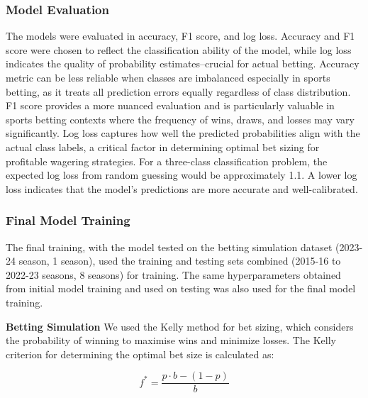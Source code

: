 \documentclass[conference]{IEEEtran}
\begin{document}
\subsubsection{Model Evaluation}
The models were evaluated in accuracy, F1 score, and log loss. Accuracy and F1 score were chosen to reflect the classification ability of the model, while log loss indicates the quality of probability estimates--crucial for actual betting. Accuracy metric can be less reliable when classes are imbalanced especially in sports betting, as it treats all prediction errors equally regardless of class distribution.
F1 score provides a more nuanced evaluation and is particularly valuable in sports betting contexts where the frequency of wins, draws, and losses may vary significantly.
Log loss captures how well
the predicted probabilities align with the actual class labels, a
critical factor in determining optimal bet sizing for profitable
wagering strategies. For a three-class classification problem, the expected log loss from random guessing would be approximately
1.1. A lower log loss indicates that the model’s predictions are
more accurate and well-calibrated. 
\subsubsection{Final Model Training}
The final training, with the model tested on the betting simulation dataset (2023-24 season, 1 season), used the training and testing sets combined (2015-16 to 2022-23 seasons, 8 seasons) for training. The same hyperparameters obtained from initial model training and used on testing was also used for the final model training.

\noindent\textbf{Betting Simulation
}We used the Kelly method \cite{kelly1956new} for bet sizing, which considers the probability of winning to maximise wins and minimize losses. The Kelly criterion for determining the optimal bet size is calculated as:

\begin{equation}
f^* = \frac{p \cdot b - (1-p)}{b}\label{eq1}
\end{equation}
\end{document}
